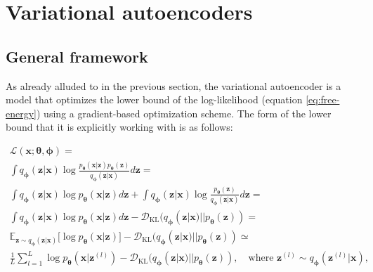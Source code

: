 \documentclass{report}
\begin{document}
\section{Variational autoencoders}

\subsection{General framework}

As already alluded to in the previous section, the variational autoencoder is a model that optimizes the lower bound of the log-likelihood (equation \ref{eq:free-energy}) using a gradient-based optimization scheme. The form of the lower bound that it is explicitly working with is as follows:

\begin{equation}
\begin{gathered}
\mathcal{L}(\boldsymbol{x}; \boldsymbol{\theta}, \boldsymbol{\phi}) = \\
\int q_{\boldsymbol{\phi}}(\boldsymbol{z}|\boldsymbol{x}) \log \frac{p_{\boldsymbol{\theta}}(\boldsymbol{x} | \boldsymbol{z}) p_{\boldsymbol{\theta}}(\boldsymbol{z})}{q_{\boldsymbol{\phi}}(\boldsymbol{z}|\boldsymbol{x})} d \boldsymbol{z} = \\ 
\int q_{\boldsymbol{\phi}}(\boldsymbol{z}|\boldsymbol{x}) \log p_{\boldsymbol{\theta}}(\boldsymbol{x} | \boldsymbol{z}) d \boldsymbol{z} + \int q_{\boldsymbol{\phi}}(\boldsymbol{z}|\boldsymbol{x}) \log \frac{p_{\boldsymbol{\theta}}(\boldsymbol{z})}{q_{\boldsymbol{\phi}}(\boldsymbol{z}|\boldsymbol{x})} d \boldsymbol{z}  = \\
\int q_{\boldsymbol{\phi}}(\boldsymbol{z}|\boldsymbol{x}) \log p_{\boldsymbol{\theta}}(\boldsymbol{x} | \boldsymbol{z}) d \boldsymbol{z} - \mathcal{D}_\text{KL}(q_{\boldsymbol{\phi}}(\boldsymbol{z}|\boldsymbol{x}) || p_{\boldsymbol{\theta}}(\boldsymbol{z})) = \\
\mathbb{E}_{\boldsymbol{z} \sim q_{\boldsymbol{\phi}}(\boldsymbol{z}|\boldsymbol{x})} \big[ \log p_{\boldsymbol{\theta}} (\boldsymbol{x} | \boldsymbol{z}) \big] - \mathcal{D}_\text{KL}(q_{\boldsymbol{\phi}}(\boldsymbol{z}|\boldsymbol{x}) || p_{\boldsymbol{\theta}}(\boldsymbol{z})) \simeq \\
\frac{1}{L} \sum_{l=1}^L \log p_{\boldsymbol{\theta}} (\boldsymbol{x} | \boldsymbol{z}^{(l)}) - \mathcal{D}_\text{KL}(q_{\boldsymbol{\phi}}(\boldsymbol{z}|\boldsymbol{x}) || p_{\boldsymbol{\theta}}(\boldsymbol{z})), \quad \text{where } \boldsymbol{z}^{(l)} \sim q_{\boldsymbol{\phi}}(\boldsymbol{z}^{(l)} | \boldsymbol{x}),
\end{gathered}
\label{eq:vae-lb}
\end{equation} \\
\end{document}
